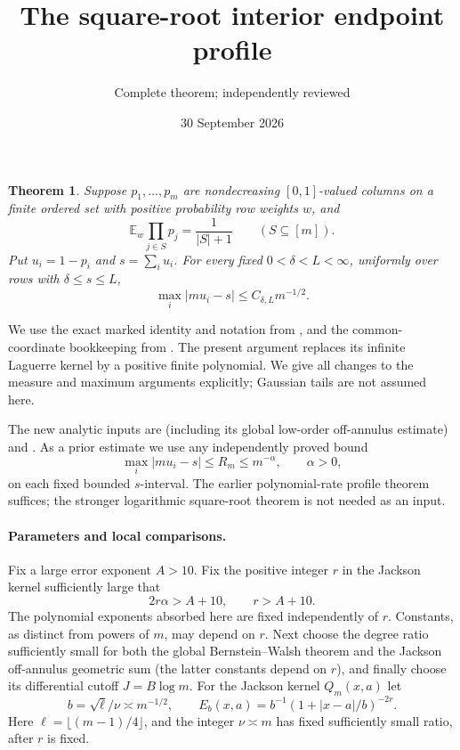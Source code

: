 \documentclass[11pt]{article}
\title{The square-root interior endpoint profile}
\author{Complete theorem; independently reviewed}
\date{30 September 2026}
\newtheorem{theorem}{Theorem}\newtheorem{lemma}{Lemma}
\newcommand{\E}{\mathbb E}
\begin{document}
\maketitle

\begin{theorem}\label{main}
Suppose $p_1,\ldots,p_m$ are nondecreasing $[0,1]$-valued columns
on a finite ordered set with positive probability row weights $w$,
and
\[
 \E_w\prod_{j\in S}p_j=\frac1{|S|+1}\qquad(S\subseteq[m]).
\]
Put $u_i=1-p_i$ and $s=\sum_i u_i$. For every fixed
$0<\delta<L<\infty$, uniformly over rows with $\delta\le s\le L$,
\[
 \max_i|m u_i-s|\le C_{\delta,L}m^{-1/2}.
\]
\end{theorem}

We use the exact marked identity and notation from
, and the common-coordinate
bookkeeping from . The
present argument replaces its infinite Laguerre kernel by a positive
finite polynomial. We give all changes to the measure and maximum
arguments explicitly; Gaussian tails are not assumed here.

The new analytic inputs are
(including its global low-order off-annulus estimate) and
.
As a prior estimate we use any independently proved bound
\begin{equation}\label{prior}
 \max_i|m u_i-s|\le R_m\le m^{-\alpha},\qquad\alpha>0,
\end{equation}
on each fixed bounded $s$-interval. The earlier polynomial-rate
profile theorem suffices; the stronger logarithmic square-root
theorem is not needed as an input.

\paragraph{Parameters and local comparisons.}
Fix a large error exponent $A>10$. Fix the positive integer $r$ in
the Jackson kernel sufficiently large that
\begin{equation}\label{rchoice}
 2r\alpha>A+10,\qquad r>A+10.
\end{equation}
The polynomial exponents absorbed here are fixed independently of
$r$. Constants, as distinct from powers of $m$, may depend on $r$.
Next choose the degree ratio sufficiently small for both the global
Bernstein--Walsh theorem and the Jackson off-annulus geometric sum
(the latter constants depend on $r$), and finally choose its differential cutoff
$J=B\log m$. For the Jackson kernel $Q_m(x,a)$ let
\[
 b=\sqrt\ell/\nu\asymp m^{-1/2},\qquad
 E_b(x,a)=b^{-1}(1+|x-a|/b)^{-2r}.
\]
Here $\ell=\lfloor(m-1)/4\rfloor$, and the integer $\nu\asymp m$
has fixed sufficiently small ratio, after $r$ is fixed.
\end{document}
